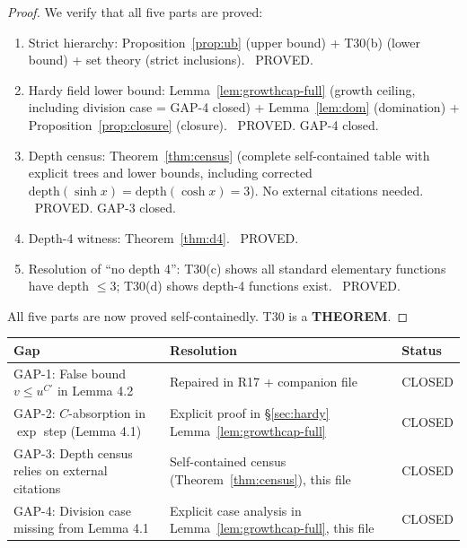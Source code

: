 \documentclass[12pt,a4paper]{article}
\theoremstyle{definition}
\theoremstyle{remark}
\begin{document}
\begin{proof}
We verify that all five parts are proved:
\begin{enumerate}
  \item[(a)] Strict hierarchy: Proposition~\ref{prop:ub} (upper bound) +
             T30(b) (lower bound) + set theory (strict inclusions).
             \textcolor{verdictgreen}{\checkmark\ PROVED.}

  \item[(b)] Hardy field lower bound: Lemma~\ref{lem:growthcap-full}
             (growth ceiling, including division case = GAP-4 closed) +
             Lemma~\ref{lem:dom} (domination) + Proposition~\ref{prop:closure} (closure).
             \textcolor{verdictgreen}{\checkmark\ PROVED. GAP-4 closed.}

  \item[(c)] Depth census: Theorem~\ref{thm:census} (complete self-contained table
             with explicit trees and lower bounds, including corrected
             $\mathrm{depth}(\sinh x) = \mathrm{depth}(\cosh x) = 3$).
             No external citations needed.
             \textcolor{verdictgreen}{\checkmark\ PROVED. GAP-3 closed.}

  \item[(d)] Depth-4 witness: Theorem~\ref{thm:d4}.
             \textcolor{verdictgreen}{\checkmark\ PROVED.}

  \item[(e)] Resolution of ``no depth 4'': T30(c) shows all standard elementary
             functions have depth $\leq 3$; T30(d) shows depth-4 functions exist.
             \textcolor{verdictgreen}{\checkmark\ PROVED.}
\end{enumerate}
All five parts are now proved self-containedly.  T30 is a \textbf{THEOREM}.
\end{proof}

\begin{center}
\begin{tabular}{@{}lll@{}}
\toprule
\textbf{Gap} & \textbf{Resolution} & \textbf{Status} \\
\midrule
GAP-1: False bound $v \leq u^{C'}$ in Lemma 4.2
  & Repaired in R17 + companion file
  & \textcolor{verdictgreen}{CLOSED} \\
GAP-2: $C$-absorption in $\exp$ step (Lemma 4.1)
  & Explicit proof in \S\ref{sec:hardy} Lemma~\ref{lem:growthcap-full}
  & \textcolor{verdictgreen}{CLOSED} \\
GAP-3: Depth census relies on external citations
  & Self-contained census (Theorem~\ref{thm:census}), this file
  & \textcolor{verdictgreen}{CLOSED} \\
GAP-4: Division case missing from Lemma 4.1
  & Explicit case analysis in Lemma~\ref{lem:growthcap-full}, this file
  & \textcolor{verdictgreen}{CLOSED} \\
\bottomrule
\end{tabular}
\end{center}
\end{document}
